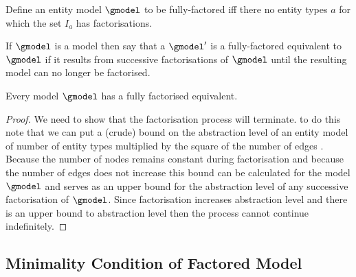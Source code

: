 \begin{definition}
Define an entity model $\gmodel$ to be fully-factored iff there no entity types $a$
for which the set $I_a$ has  factorisations.
\end{definition}

\begin{definition}
If $\gmodel$ is a model then say that a $\gmodel'$ is a fully-factored 
equivalent to $\gmodel$
if it results from successive factorisations of $\gmodel$ until the resulting model can no longer be
factorised. 
\end{definition}

\begin{lemma}
Every model $\gmodel$ has a fully factorised equivalent. 
\end{lemma}
\begin{proof}
We need to show that the factorisation process will terminate. 
to do this note that we can put a (crude) bound on the abstraction level of an entity model
of number of entity types multiplied by the square of the  number of edges
.  Because the number of nodes remains constant during
factorisation and because the number of edges does not increase this bound can be calculated
for the model $\gmodel$ and serves as an upper bound for the abstraction level of 
any successive factorisation of $\gmodel$. Since factorisation increases abstraction level
and there is an upper bound to abstraction level then the process cannot continue indefinitely. 
\end{proof}

\subsection{Minimality Condition of Factored Model}

